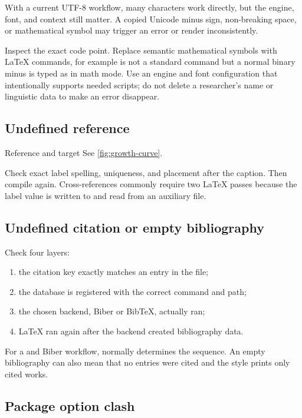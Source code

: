 With a current UTF-8 workflow, many characters work directly, but the engine,
font, and context still matter. A copied Unicode minus sign, non-breaking space,
or mathematical symbol may trigger an error or render inconsistently.

Inspect the exact code point. Replace semantic mathematical symbols with \LaTeX{}
commands, for example  is not a standard command but a normal binary
minus is typed as \code{-} in math mode. Use an engine and font configuration
that intentionally supports needed scripts; do not delete a researcher's name
or linguistic data to make an error disappear.

\subsection{Undefined reference}

\begin{latexcode}{Reference and target}
See \cref{fig:growth-curve}.
\label{fig:growth-curve}
\end{latexcode}

Check exact label spelling, uniqueness, and placement after the caption. Then
compile again. Cross-references commonly require two \LaTeX{} passes because the
label value is written to and read from an auxiliary file.

\subsection{Undefined citation or empty bibliography}

Check four layers:

\begin{enumerate}
  \item the citation key exactly matches an entry in the  file;
  \item the database is registered with the correct command and path;
  \item the chosen backend, Biber or BibTeX, actually ran;
  \item \LaTeX{} ran again after the backend created bibliography data.
\end{enumerate}

For a  and Biber workflow,  normally determines the
sequence. An empty bibliography can also mean that no entries were cited and
the style prints only cited works.

\subsection{Package option clash}

